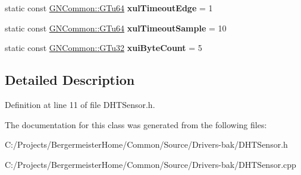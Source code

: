 \begin{DoxyCompactItemize}
static const \mbox{\hyperlink{namespace_g_n_common_a01e8527dabf7ab4f123156b0701945eb}{G\+N\+Common\+::\+G\+Tu64}} {\bfseries xul\+Timeout\+Edge} = 1
\item 
\mbox{\label{class_g_n_common_1_1_g_n_drivers_1_1_g_tc_d_h_t_sensor_a90e9a1dd52460d5c90503f057267b87d}} 
static const \mbox{\hyperlink{namespace_g_n_common_a01e8527dabf7ab4f123156b0701945eb}{G\+N\+Common\+::\+G\+Tu64}} {\bfseries xul\+Timeout\+Sample} = 10
\item 
\mbox{\label{class_g_n_common_1_1_g_n_drivers_1_1_g_tc_d_h_t_sensor_a697bb711acabf32ba3b7e55befc1a142}} 
static const \mbox{\hyperlink{namespace_g_n_common_ae5485474bc8f23e462e920a17b377b53}{G\+N\+Common\+::\+G\+Tu32}} {\bfseries xui\+Byte\+Count} = 5
\end{DoxyCompactItemize}


\subsection{Detailed Description}


Definition at line 11 of file D\+H\+T\+Sensor.\+h.



The documentation for this class was generated from the following files\+:\begin{DoxyCompactItemize}
\item 
C\+:/\+Projects/\+Bergermeister\+Home/\+Common/\+Source/\+Drivers-\/bak/D\+H\+T\+Sensor.\+h\item 
C\+:/\+Projects/\+Bergermeister\+Home/\+Common/\+Source/\+Drivers-\/bak/D\+H\+T\+Sensor.\+cpp\end{DoxyCompactItemize}
